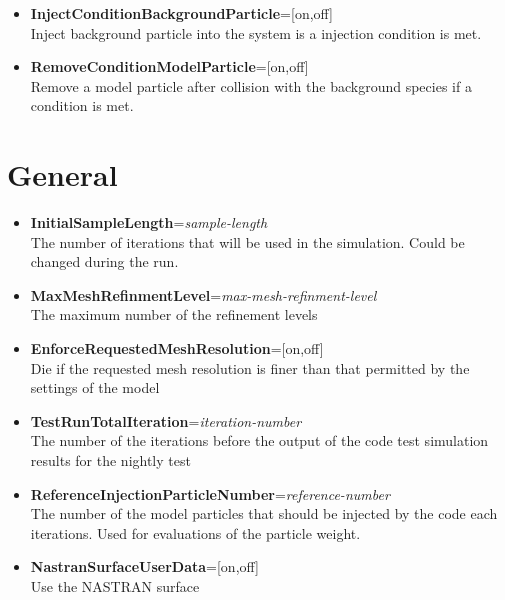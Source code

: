 \begin{itemize}
{\tt CollisionScatteringAngle=isotropic}

Example (function): 

{\tt CollisionScatteringAngle=function $\backslash\backslash$ \\ FunctionName={\it function-name}} 

\item {\bf InjectConditionBackgroundParticle}=[on,off] \\ Inject background particle into the system is a injection condition is met.

\item {\bf RemoveConditionModelParticle}=[on,off] \\ Remove a model particle after collision with the background species if a condition is met.


\end{itemize}












\section{General}

\begin{itemize}
\item {\bf InitialSampleLength}={\it sample-length} \\ The number of iterations that will be used in the simulation. Could be changed during the run.

\item {\bf MaxMeshRefinmentLevel}={\it max-mesh-refinment-level} \\ The maximum number of the refinement levels

\item {\bf EnforceRequestedMeshResolution}=[on,off] \\ Die if the requested mesh resolution is finer than that permitted by the settings of the model

\item {\bf TestRunTotalIteration}={\it iteration-number} \\ The number of the iterations before the output of the code test simulation results for the nightly test

\item {\bf ReferenceInjectionParticleNumber}={\it reference-number} \\ The number of the model particles that should be injected by the code each iterations. Used for evaluations of the particle weight.

\item {\bf NastranSurfaceUserData}=[on,off] \\ Use the NASTRAN surface 

\end{itemize}




